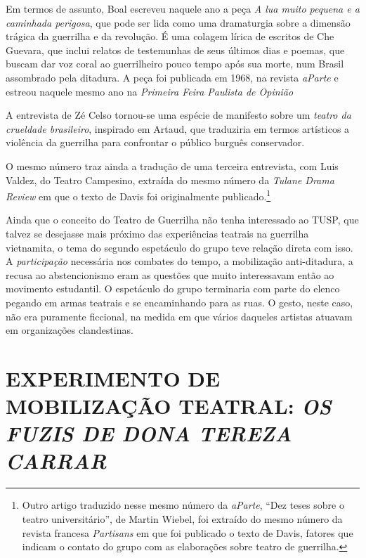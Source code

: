 Em termos de assunto, Boal escreveu naquele ano a peça \textit{A lua muito
pequena e a caminhada perigosa}, que pode ser lida como uma dramaturgia
sobre a dimensão trágica da guerrilha e da revolução. É uma colagem
lírica de escritos de Che Guevara, que inclui relatos de testemunhas de
seus últimos dias e poemas, que buscam dar voz coral ao guerrilheiro
pouco tempo após sua morte, num Brasil assombrado pela ditadura. A peça
foi publicada em 1968, na revista \textit{aParte} e estreou naquele mesmo
ano na \textit{Primeira Feira Paulista de Opinião}

A entrevista de Zé Celso tornou-se uma espécie de manifesto sobre um
\textit{teatro da crueldade brasileiro}, inspirado em Artaud, que
traduziria em termos artísticos a violência da guerrilha para confrontar
o público burguês conservador.

O mesmo número traz ainda a tradução de uma terceira entrevista, com
Luis Valdez, do Teatro Campesino, extraída do mesmo número da
\textit{Tulane Drama Review} em que o texto de Davis foi originalmente
publicado.\footnote{Outro artigo traduzido nesse mesmo número da
  \textit{aParte}, “Dez teses sobre o teatro universitário”, de Martin
  Wiebel, foi extraído do mesmo número da revista francesa
  \textit{Partisans} em que foi publicado o texto de Davis, fatores que
  indicam o contato do grupo com as elaborações sobre teatro de
  guerrilha.}

Ainda que o conceito do Teatro de Guerrilha não tenha interessado ao
TUSP, que talvez se desejasse mais próximo das experiências teatrais na
guerrilha vietnamita, o tema do segundo espetáculo do grupo teve relação
direta com isso. A \textit{participação} necessária nos combates do tempo,
a mobilização anti-ditadura, a recusa ao abstencionismo eram as questões
que muito interessavam então ao movimento estudantil. O espetáculo do
grupo terminaria com parte do elenco pegando em armas teatrais e se
encaminhando para as ruas. O gesto, neste caso, não era puramente
ficcional, na medida em que vários daqueles artistas atuavam em
organizações clandestinas.

\chapter{EXPERIMENTO DE MOBILIZAÇÃO TEATRAL: \textit{OS FUZIS DE DONA TEREZA CARRAR}}

